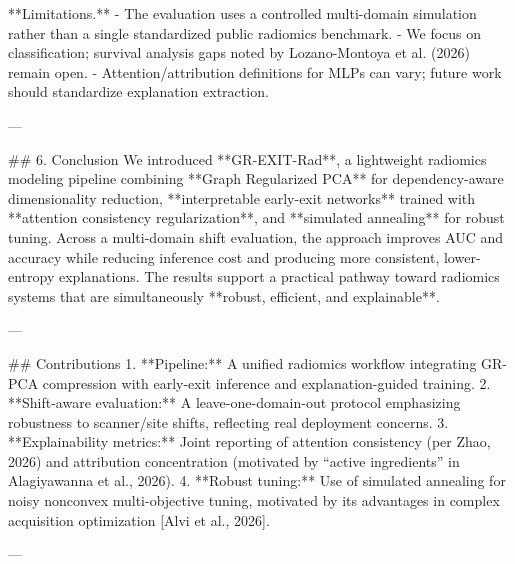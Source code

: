 **Limitations.**
- The evaluation uses a controlled multi-domain simulation rather than a single standardized public radiomics benchmark.
- We focus on classification; survival analysis gaps noted by Lozano-Montoya et al. (2026) remain open.
- Attention/attribution definitions for MLPs can vary; future work should standardize explanation extraction.

---

## 6. Conclusion
We introduced **GR-EXIT-Rad**, a lightweight radiomics modeling pipeline combining **Graph Regularized PCA** for dependency-aware dimensionality reduction, **interpretable early-exit networks** trained with **attention consistency regularization**, and **simulated annealing** for robust tuning. Across a multi-domain shift evaluation, the approach improves AUC and accuracy while reducing inference cost and producing more consistent, lower-entropy explanations. The results support a practical pathway toward radiomics systems that are simultaneously **robust, efficient, and explainable**.

---

## Contributions
1. **Pipeline:** A unified radiomics workflow integrating GR-PCA compression with early-exit inference and explanation-guided training.
2. **Shift-aware evaluation:** A leave-one-domain-out protocol emphasizing robustness to scanner/site shifts, reflecting real deployment concerns.
3. **Explainability metrics:** Joint reporting of attention consistency (per Zhao, 2026) and attribution concentration (motivated by “active ingredients” in Alagiyawanna et al., 2026).
4. **Robust tuning:** Use of simulated annealing for noisy nonconvex multi-objective tuning, motivated by its advantages in complex acquisition optimization [Alvi et al., 2026].

---